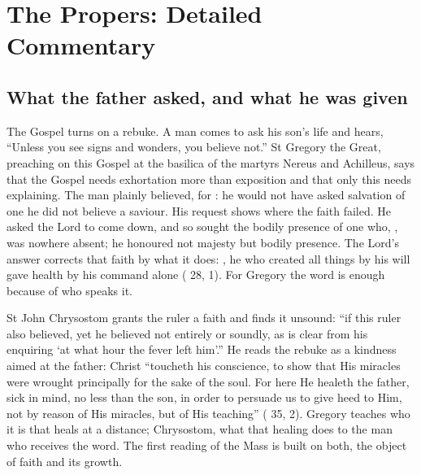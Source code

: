 
\section{The Propers: Detailed Commentary}

\subsection{What the father asked, and what he was given}

The Gospel turns on a rebuke. A man comes to ask his son's life
and hears, ``Unless you see signs and wonders, you believe not.'' St Gregory
the Great, preaching on this Gospel at the basilica of the martyrs Nereus and
Achilleus, says that the Gospel needs exhortation more than exposition and that only
this needs explaining. The man plainly believed, for : he would not have asked
salvation of one he did not believe a saviour. His request shows where the
faith failed. 
He asked the Lord to come down, and so sought the bodily presence of one who,
, was nowhere absent; he honoured not majesty but bodily
presence. The Lord's answer corrects that faith by what it does: , he who created all things
by his will gave health by his command alone ( 28,
1). For Gregory the word is enough because of who speaks it.

St John Chrysostom grants the ruler a faith and finds it unsound: ``if this
ruler also believed, yet he believed not entirely or soundly, as is clear from
his enquiring `at what hour the fever left him'.'' He reads the rebuke as a
kindness aimed at the father: Christ ``toucheth his conscience, to show that His
miracles were wrought principally for the sake of the soul. For here He healeth
the father, sick in mind, no less than the son, in order to persuade us to give
heed to Him, not by reason of His miracles, but of His teaching''
( 35, 2). Gregory teaches who it is that heals at a
distance; Chrysostom, what that healing does to the man who receives the word.
The first reading of the Mass is built on both, the object of faith and its
growth.

